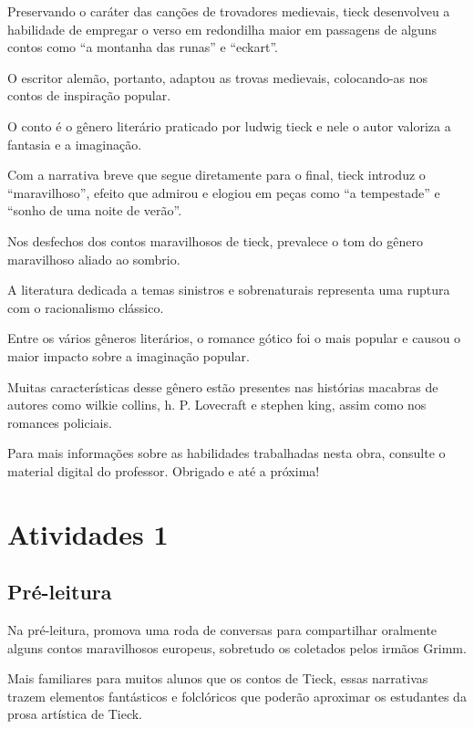 \documentclass[11pt]{extarticle}
\begin{document}
Preservando o caráter das canções de trovadores medievais, tieck desenvolveu a habilidade de empregar o verso em redondilha maior em passagens de alguns contos como “a montanha das runas” e “eckart”. 

O escritor alemão, portanto, adaptou as trovas medievais, colocando-as nos contos de inspiração popular.

O conto é o gênero literário praticado por ludwig tieck e nele o autor valoriza a fantasia e a imaginação.

Com a narrativa breve que segue diretamente para o final, tieck introduz o “maravilhoso”, efeito que admirou e elogiou em peças como “a tempestade” e “sonho de uma noite de verão”. 

Nos desfechos dos contos maravilhosos de tieck, prevalece o tom do gênero maravilhoso aliado ao sombrio.

A literatura dedicada a temas sinistros e sobrenaturais representa uma ruptura com o racionalismo clássico. 

Entre os vários gêneros literários, o romance gótico foi o mais popular e causou o maior impacto sobre a imaginação popular.

Muitas características desse gênero estão presentes nas histórias macabras de autores como wilkie collins, h. P. Lovecraft e stephen king, assim como nos romances policiais. 


Para mais informações sobre as habilidades trabalhadas nesta obra, consulte o material digital do professor. Obrigado e até a próxima!

\section{Atividades 1}


\subsection{Pré-leitura}


Na pré-leitura, promova uma roda de conversas para
compartilhar oralmente alguns contos maravilhosos europeus, sobretudo os
coletados pelos irmãos Grimm.

Mais familiares para muitos alunos que os contos de Tieck, essas
narrativas trazem elementos fantásticos e folclóricos que poderão
aproximar os estudantes da prosa artística de Tieck.
\end{document}
